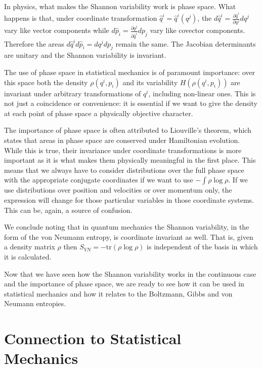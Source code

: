 \documentclass[prb, twocolumn]{revtex4-1}
\begin{document}
In physics, what makes the Shannon variability work is phase space. What happens is that, under coordinate transformation $\hat{q}^i = \hat{q}^i(q^j)$, the $d\hat{q}^i = \frac{\partial \hat{q}^i}{\partial q^j } dq^j$ vary like vector components while $d\hat{p}_i = \frac{\partial q^j}{\partial \hat{q}^i } dp_j$ vary like covector components. Therefore the areas $d\hat{q}^i d\hat{p}_i = dq^j dp_j$ remain the same. The Jacobian determinants are unitary and the Shannon variability is invariant.

The use of phase space in statistical mechanics is of paramount importance: over this space both the density $\rho(q^i, p
_i)$ and its variability $H(\rho(q^i, p
_i))$ are invariant under arbitrary transformations of $q^i$, including non-linear ones. This is not just a coincidence or convenience: it is essential if we want to give the density at each point of phase space a physically objective character.

The importance of phase space is often attributed to Liouville's theorem, which states that areas in phase space are conserved under Hamiltonian evolution. While this is true, their invariance under coordinate transformations is more important as it is what makes them physically meaningful in the first place. This means that we always have to consider distributions over the full phase space with the appropriate conjugate coordinates if we want to use $-\int \rho \log \rho$. If we use distributions over position and velocities or over momentum only, the expression will change for those particular variables in those coordinate systems. This can be, again, a source of confusion.\cite{Dunkel}


We conclude noting that in quantum mechanics the Shannon variability, in the form of the von Neumann entropy, is coordinate invariant as well. That is, given a density matrix $\rho$ then $S_{VN} = - \textrm{tr}(\rho \log \rho)$ is independent of the basis in which it is calculated.

Now that we have seen how the Shannon variability works in the continuous case and the importance of phase space, we are ready to see how it can be used in statistical mechanics and how it relates to the Boltzmann, Gibbs and von Neumann entropies.

\section{Connection to Statistical Mechanics\label{csm}}
\end{document}
